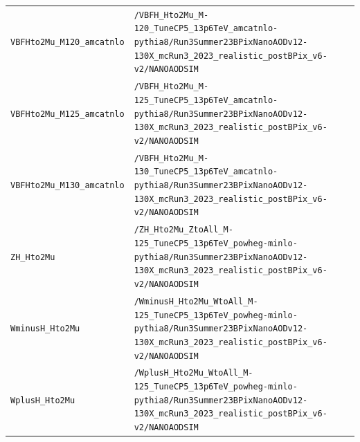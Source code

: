 \begin{longtable}{@{}>{\RaggedRight\arraybackslash}p{} >{\RaggedRight\arraybackslash}p{}@{}}
\addlinespace[2pt]
\texttt{VBFHto2Mu\_\allowbreak{}M120\_\allowbreak{}amcatnlo} & \texttt{/\allowbreak{}VBFH\_\allowbreak{}Hto2Mu\_\allowbreak{}M-\allowbreak{}120\_\allowbreak{}TuneCP5\_\allowbreak{}13p6TeV\_\allowbreak{}amcatnlo-\allowbreak{}pythia8/\allowbreak{}Run3Summer23BPixNanoAODv12-\allowbreak{}130X\_\allowbreak{}mcRun3\_\allowbreak{}2023\_\allowbreak{}realistic\_\allowbreak{}postBPix\_\allowbreak{}v6-\allowbreak{}v2/\allowbreak{}NANOAODSIM} \\
\addlinespace[2pt]
\texttt{VBFHto2Mu\_\allowbreak{}M125\_\allowbreak{}amcatnlo} & \texttt{/\allowbreak{}VBFH\_\allowbreak{}Hto2Mu\_\allowbreak{}M-\allowbreak{}125\_\allowbreak{}TuneCP5\_\allowbreak{}13p6TeV\_\allowbreak{}amcatnlo-\allowbreak{}pythia8/\allowbreak{}Run3Summer23BPixNanoAODv12-\allowbreak{}130X\_\allowbreak{}mcRun3\_\allowbreak{}2023\_\allowbreak{}realistic\_\allowbreak{}postBPix\_\allowbreak{}v6-\allowbreak{}v2/\allowbreak{}NANOAODSIM} \\
\addlinespace[2pt]
\texttt{VBFHto2Mu\_\allowbreak{}M130\_\allowbreak{}amcatnlo} & \texttt{/\allowbreak{}VBFH\_\allowbreak{}Hto2Mu\_\allowbreak{}M-\allowbreak{}130\_\allowbreak{}TuneCP5\_\allowbreak{}13p6TeV\_\allowbreak{}amcatnlo-\allowbreak{}pythia8/\allowbreak{}Run3Summer23BPixNanoAODv12-\allowbreak{}130X\_\allowbreak{}mcRun3\_\allowbreak{}2023\_\allowbreak{}realistic\_\allowbreak{}postBPix\_\allowbreak{}v6-\allowbreak{}v2/\allowbreak{}NANOAODSIM} \\
\addlinespace[2pt]
\texttt{ZH\_\allowbreak{}Hto2Mu} & \texttt{/\allowbreak{}ZH\_\allowbreak{}Hto2Mu\_\allowbreak{}ZtoAll\_\allowbreak{}M-\allowbreak{}125\_\allowbreak{}TuneCP5\_\allowbreak{}13p6TeV\_\allowbreak{}powheg-\allowbreak{}minlo-\allowbreak{}pythia8/\allowbreak{}Run3Summer23BPixNanoAODv12-\allowbreak{}130X\_\allowbreak{}mcRun3\_\allowbreak{}2023\_\allowbreak{}realistic\_\allowbreak{}postBPix\_\allowbreak{}v6-\allowbreak{}v2/\allowbreak{}NANOAODSIM} \\
\addlinespace[2pt]
\texttt{WminusH\_\allowbreak{}Hto2Mu} & \texttt{/\allowbreak{}WminusH\_\allowbreak{}Hto2Mu\_\allowbreak{}WtoAll\_\allowbreak{}M-\allowbreak{}125\_\allowbreak{}TuneCP5\_\allowbreak{}13p6TeV\_\allowbreak{}powheg-\allowbreak{}minlo-\allowbreak{}pythia8/\allowbreak{}Run3Summer23BPixNanoAODv12-\allowbreak{}130X\_\allowbreak{}mcRun3\_\allowbreak{}2023\_\allowbreak{}realistic\_\allowbreak{}postBPix\_\allowbreak{}v6-\allowbreak{}v2/\allowbreak{}NANOAODSIM} \\
\addlinespace[2pt]
\texttt{WplusH\_\allowbreak{}Hto2Mu} & \texttt{/\allowbreak{}WplusH\_\allowbreak{}Hto2Mu\_\allowbreak{}WtoAll\_\allowbreak{}M-\allowbreak{}125\_\allowbreak{}TuneCP5\_\allowbreak{}13p6TeV\_\allowbreak{}powheg-\allowbreak{}minlo-\allowbreak{}pythia8/\allowbreak{}Run3Summer23BPixNanoAODv12-\allowbreak{}130X\_\allowbreak{}mcRun3\_\allowbreak{}2023\_\allowbreak{}realistic\_\allowbreak{}postBPix\_\allowbreak{}v6-\allowbreak{}v2/\allowbreak{}NANOAODSIM} \\

\end{longtable}
